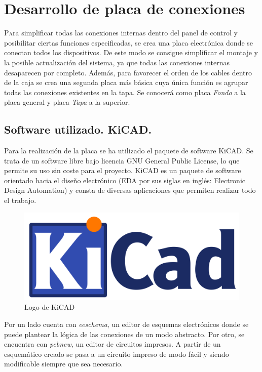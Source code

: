 \chapter{Desarrollo de placa de conexiones}\label{chp-03}

\lettrine[lraise=-0.1, lines=2, loversize=0.2]{P}ara simplificar todas las conexiones internas dentro del panel de control y posibilitar ciertas funciones especificadas, se crea una placa electrónica donde se conectan todos los dispositivos. De este modo se consigue simplificar el montaje y la posible actualización del sistema, ya que todas las conexiones internas desaparecen por completo. Además, para favorecer el orden de los cables dentro de la caja se crea una segunda placa más básica cuya única función es agrupar todas las conexiones existentes en la tapa. Se conocerá como placa \textit{Fondo} a la placa general y placa \textit{Tapa} a la superior. 

\section{Software utilizado. KiCAD.}

Para la realización de la placa se ha utilizado el paquete de software KiCAD. Se trata de un software 
libre bajo licencia GNU General Public License, lo que permite su uso sin coste para el proyecto. KiCAD
es un paquete de software orientado hacia el diseño electrónico (EDA por sus siglas en inglés: Electronic
Design Automation) y consta de diversas aplicaciones que permiten realizar todo el trabajo.

\begin{figure}[hbtp]
    \centering
    \includegraphics[width=\textwidth/2]{03-placa/01-KiCad-Logo.png}
    \caption{Logo de KiCAD}
    \label{fig:figura31logo}
    \end{figure}

Por un lado cuenta con \textit{eeschema}, un editor de esquemas electrónicos donde se puede plantear
la lógica de las conexiones de un modo abstracto. Por otro, se encuentra con \textit{pcbnew}, un editor
de circuitos impresos. A partir de un esquemático creado se pasa a un circuito impreso de modo fácil y
siendo modificable siempre que sea necesario.

